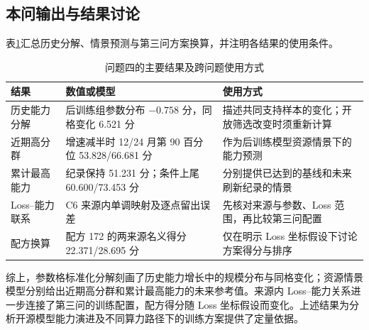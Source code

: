 \subsection{本问输出与结果讨论}

表\ref{tab:q4-output}汇总历史分解、情景预测与第三问方案换算，并注明各结果的使用条件。

\begin{table}[htbp]
 \centering\small
 \caption{问题四的主要结果及跨问题使用方式}
 \label{tab:q4-output}
 \begin{tabular}{p{2.5cm}p{4.2cm}p{5.8cm}}
 \toprule
 结果 & 数值或模型 & 使用方式\\
 \midrule
 历史能力分解 & 后训练组参数分布 $-0.758$ 分，同格变化 6.521 分 & 描述共同支持样本的变化；开放筛选改变时须重新计算\\
 近期高分群 & 增速减半时 12/24 月第 90 百分位 53.828/66.681 分 & 作为后训练模型资源情景下的能力预测\\
 累计最高能力 & 纪录保持 51.231 分；条件上尾 60.600/73.453 分 & 分别提供已达到的基线和未来刷新纪录的情景\\
 Loss--能力联系 & C6 来源内单调映射及逐点留出误差 & 先核对来源与参数、Loss 范围，再比较第三问配置\\
 配方换算 & 配方 172 的两来源名义得分 22.371/28.695 分 & 仅在明示 Loss 坐标假设下讨论方案得分与排序\\
 \bottomrule
 \end{tabular}
\end{table}

综上，参数格标准化分解刻画了历史能力增长中的规模分布与同格变化；资源情景模型分别给出近期高分群和累计最高能力的未来参考值。来源内 Loss--能力关系进一步连接了第三问的训练配置，配方得分随 Loss 坐标假设而变化。上述结果为分析开源模型能力演进及不同算力路径下的训练方案提供了定量依据。
